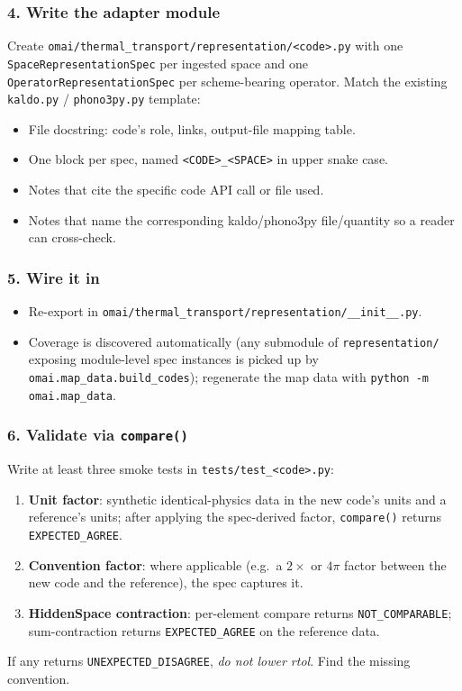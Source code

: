 \documentclass[11pt,a4paper]{article}
\begin{document}
\subsubsection*{4. Write the adapter module}

Create \texttt{omai/thermal\_transport/representation/<code>.py} with one
\texttt{SpaceRepresentationSpec} per ingested space and one
\texttt{OperatorRepresentationSpec} per scheme-bearing operator. Match the existing
\texttt{kaldo.py} / \texttt{phono3py.py} template:
\begin{itemize}[leftmargin=2em]
  \item File docstring: code's role, links, output-file mapping table.
  \item One block per spec, named \texttt{<CODE>\_<SPACE>} in upper snake case.
  \item Notes that cite the specific code API call or file used.
  \item Notes that name the corresponding kaldo/phono3py file/quantity so a reader
        can cross-check.
\end{itemize}

\subsubsection*{5. Wire it in}

\begin{itemize}[leftmargin=2em]
  \item Re-export in \texttt{omai/thermal\_transport/representation/\_\_init\_\_.py}.
  \item Coverage is discovered automatically (any submodule of
        \texttt{representation/} exposing module-level spec instances is picked
        up by \texttt{omai.map\_data.build\_codes}); regenerate the map data
        with \texttt{python -m omai.map\_data}.
\end{itemize}

\subsubsection*{6. Validate via \texttt{compare()}}

Write at least three smoke tests in \texttt{tests/test\_<code>.py}:
\begin{enumerate}[leftmargin=2em]
  \item \textbf{Unit factor}: synthetic identical-physics data in the new code's
        units and a reference's units; after applying the spec-derived factor,
        \texttt{compare()} returns \texttt{EXPECTED\_AGREE}.
  \item \textbf{Convention factor}: where applicable (e.g.\ a $2\times$ or $4\pi$
        factor between the new code and the reference), the spec captures it.
  \item \textbf{HiddenSpace contraction}: per-element compare returns
        \texttt{NOT\_COMPARABLE}; sum-contraction returns \texttt{EXPECTED\_AGREE}
        on the reference data.
\end{enumerate}
If any returns \texttt{UNEXPECTED\_DISAGREE}, \emph{do not lower rtol}. Find the
missing convention.
\end{document}
